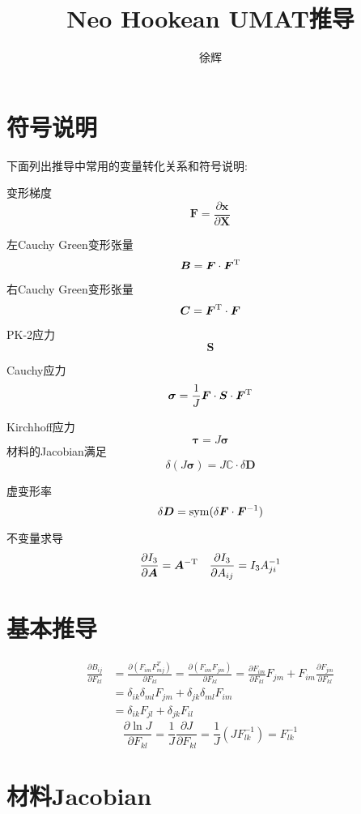 \documentclass{article}
\title{Neo Hookean UMAT推导}
\author{徐辉}
\begin{document}
\maketitle
\section{符号说明}
下面列出推导中常用的变量转化关系和符号说明:

变形梯度
$$\bm{F}=\frac{\partial \bm{x}}{ \partial \bm{X}}$$

左Cauchy Green变形张量
$$\bm{B}= \bm{F} \cdot \bm{F}^{\rm T}$$

右Cauchy Green变形张量
$$\bm{C}=\bm{F}^{\rm T}\cdot \bm{F}$$

PK-2应力
$$\bm{S}$$

Cauchy应力
$$\bm{\sigma}=\frac{1}{J}\bm{F}\cdot \bm{S} \cdot \bm{F}^{\rm T}$$

Kirchhoff应力
$$\bm{\tau}=J\bm{\sigma}$$
材料的Jacobian满足
$$\delta(J\bm{\sigma})=J\mathbb{C}\cdot \delta \bm{D}$$

虚变形率
$$\delta \bm{D}={\rm sym}(\delta \bm{F}\cdot \bm{F}^{-1})$$

不变量求导
$$\frac{\partial I_3}{\partial \bm{A}}=\bm{A}^{\rm -T}\quad \frac{\partial I_3}{\partial A_{ij}}=I_3 A_{ji}^{-1}$$

\section{基本推导}
\begin{equation*}
    \begin{aligned}
        \frac{\partial B_{ij}}{\partial F_{kl}} & =\frac{\partial (F_{im}F_{mj}^T)}{\partial F_{kl}}=\frac{\partial (F_{im}F_{jm})}{\partial F_{kl}}
        =\frac{\partial F_{im}}{\partial F_{kl}}F_{jm} +F_{im} \frac{\partial F_{jm}}{\partial F_{kl}}                                               \\
                                                & =\delta_{ik}\delta_{ml}F_{jm}+\delta_{jk}\delta_{ml}F_{im}                                         \\
                                                & =\delta_{ik}F_{jl}+\delta_{jk}F_{il}
    \end{aligned}
\end{equation*}
$$\frac{\partial \ln J}{\partial F_{kl}}=\frac{1}{J}\frac{\partial J}{\partial F_{kl}}=\frac{1}{J}(JF_{lk}^{-1})=F_{lk}^{-1}$$
\section{材料Jacobian}
\end{document}
